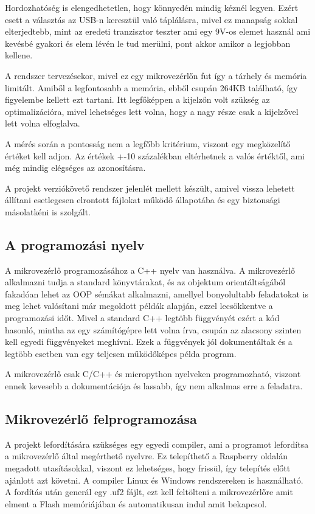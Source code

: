 Hordozhatóség is elengedhetetlen, hogy könnyedén mindig kéznél legyen.
Ezért esett a választás az USB-n keresztül való táplálásra, mivel ez 
manapság sokkal elterjedtebb, mint az eredeti tranzisztor teszter ami egy
9V-os elemet használ ami kevésbé gyakori és elem lévén le tud merülni, pont 
akkor amikor a legjobban kellene.

A rendszer tervezésekor, mivel ez egy mikrovezérlőn fut így a 
tárhely és memória limitált. Amiből a legfontosabb a memória, ebből 
csupán 264KB található, így figyelembe kellett ezt tartani. Itt 
legfőképpen a kijelzőn volt szükség az optimalizációra, mivel 
lehetséges lett volna, hogy a nagy része csak a kijelzővel lett volna elfoglalva.

A mérés során a pontosság nem a legfőbb kritérium, viszont egy megközelítő
értéket kell adjon. Az értékek +-10 százalékban eltérhetnek a valós értéktől, 
ami még mindig elégséges az azonosításra. 

A projekt verziókövető rendszer jelenlét mellett készült, amivel
vissza lehetett állítani esetlegesen elrontott fájlokat működő állapotába
és egy biztonsági másolatkéni is szolgált.


\subsection{A programozási nyelv}

A mikrovezérlő programozásához a C++ nyelv van használva. A mikrovezérlő alkalmazni 
tudja a standard könyvtárakat, és az objektum orientáltságából fakadóan lehet az 
OOP sémákat alkalmazni, amellyel bonyolultabb feladatokat is meg lehet valósítani
már megoldott példák alapján, ezzel lecsökkentve a programozási időt.
Mivel a standard C++ legtöbb függvényét ezért a kód hasonló, mintha az egy számítógépre
lett volna írva, csupán az alacsony szinten kell egyedi függvényeket meghívni.
Ezek a függvények jól dokumentáltak és a legtöbb esetben van egy teljesen működőképes
példa program.

A mikrovezérlő csak C/C++ és micropython nyelveken programozható, viszont ennek
kevesebb a dokumentációja és lassabb, így nem alkalmas erre a feladatra.


\subsection{Mikrovezérlő felprogramozása}

A projekt lefordítására szükséges egy egyedi compiler, ami a programot lefordítsa
a mikrovezérlő által megérthető nyelvre. Ez telepíthető a Raspberry oldalán megadott 
utasításokkal, viszont ez lehetséges, hogy frissül, így telepítés előtt ajánlott
azt követni. A compiler Linux és Windows rendszereken is használható. A fordítás után
generál egy .uf2 fájlt, ezt kell feltölteni a mikrovezérlőre amit elment a Flash
memóriájában és automatikusan indul amit bekapcsol.

